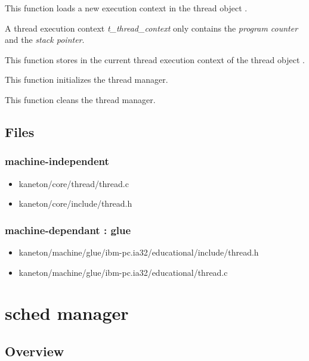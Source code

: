 {
  This function loads a new execution context in the thread
  object .

  A thread execution context \textit{t\_thread\_context}
  only contains the \textit{program counter} and the
  \textit{stack pointer}.
}

{
  This function stores in  the current
  thread execution context of the thread object .
}

{
  This function initializes the thread manager.
}

{
  This function cleans the thread manager.
}

\subsection*{Files}

\subsubsection{\color{filerefcolor} machine-independent}
\begin{itemize}
\item kaneton/core/thread/thread.c
\item kaneton/core/include/thread.h
\end{itemize}

\subsubsection{\color{filerefcolor} machine-dependant : glue}
\begin{itemize}
\item kaneton/machine/glue/ibm-pc.ia32/educational/include/thread.h
\item kaneton/machine/glue/ibm-pc.ia32/educational/thread.c
\end{itemize}

%
%

\newpage

\section{\textbf{sched} manager}
\subsection*{Overview}

